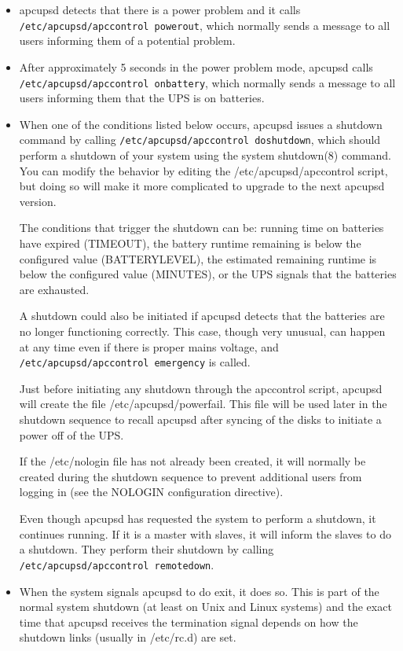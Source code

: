 {{{{{{{{{{{{{{{\begin{itemize}
\item apcupsd detects that there is a power problem and it calls {\tt
   /etc/apcupsd/apccontrol powerout}, which normally sends a message to all users
   informing them of a potential problem.  
\item After approximately 5 seconds in the power problem mode, apcupsd calls
   {\tt /etc/apcupsd/apccontrol onbattery}, which normally sends a message to all
   users informing them that the UPS is on batteries.  
\item When one of the conditions listed below occurs, apcupsd issues a
   shutdown command by calling {\tt /etc/apcupsd/apccontrol doshutdown},
   which should perform a shutdown of your system using the system
   shutdown(8) command.  You can modify the behavior by editing the
   /etc/apcupsd/apccontrol script, but doing so will make it more
   complicated to upgrade to the next apcupsd version.
 

The conditions that trigger the shutdown can be: running time on batteries
have expired (TIMEOUT), the battery runtime remaining is below the configured
value (BATTERYLEVEL), the estimated remaining runtime is below the configured
value (MINUTES), or the UPS signals that the batteries are exhausted.  

A shutdown could also be initiated if apcupsd detects that the batteries are
no longer functioning correctly. This case, though very unusual, can happen at
any time even if there is proper mains voltage, and {\tt
/etc/apcupsd/apccontrol emergency} is called.  

Just before initiating any shutdown through the apccontrol script, apcupsd
will create the file /etc/apcupsd/powerfail. This file will be used later in
the shutdown sequence to recall apcupsd after syncing of the disks to initiate
a power off of the UPS.  

If the /etc/nologin file has not already been created, it will normally be
created during the shutdown sequence to prevent additional users from logging
in (see the NOLOGIN configuration directive).  

Even though apcupsd has requested the system to perform a shutdown, it
continues running. If it is a master with slaves, it will inform the slaves to
do a shutdown. They perform their shutdown by calling {\tt
/etc/apcupsd/apccontrol remotedown}.  
\item When the system signals apcupsd to do exit, it does so.  This is part of
   the normal system shutdown (at least on Unix and Linux systems) and the exact
   time that apcupsd receives the termination signal depends on how the shutdown
links (usually in /etc/rc.d) are set.  


\end{itemize}}}}}}}}}}}}}}}}
